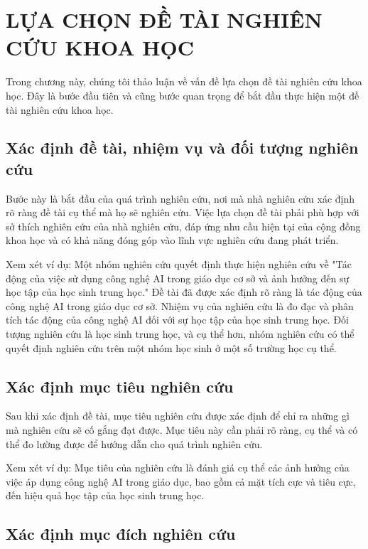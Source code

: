 \chapter{LỰA CHỌN ĐỀ TÀI NGHIÊN CỨU KHOA HỌC}

Trong chương này, chúng tôi thảo luận về vấn đề lựa chọn đề tài nghiên cứu khoa học. Đây là bước đầu tiên và cũng bước quan trọng để bắt đầu thực hiện một đề tài nghiên cứu khoa học.

\section{Xác định đề tài, nhiệm vụ và đối tượng nghiên cứu}

Bước này là bắt đầu của quá trình nghiên cứu, nơi mà nhà nghiên cứu xác định rõ ràng đề tài cụ thể mà họ sẽ nghiên cứu. Việc lựa chọn đề tài phải phù hợp với sở thích nghiên cứu của nhà nghiên cứu, đáp ứng nhu cầu hiện tại của cộng đồng khoa học và có khả năng đóng góp vào lĩnh vực nghiên cứu đang phát triển.

Xem xét ví dụ: Một nhóm nghiên cứu quyết định thực hiện nghiên cứu về "Tác động của việc sử dụng công nghệ AI trong giáo dục cơ sở và ảnh hưởng đến sự học tập của học sinh trung học." Đề tài đã được xác định rõ ràng là tác động của công nghệ AI trong giáo dục cơ sở. Nhiệm vụ của nghiên cứu là đo đạc và phân tích tác động của công nghệ AI đối với sự học tập của học sinh trung học. Đối tượng nghiên cứu là học sinh trung học, và cụ thể hơn, nhóm nghiên cứu có thể quyết định nghiên cứu trên một nhóm học sinh ở một số trường học cụ thể.

\section{Xác định mục tiêu nghiên cứu}

Sau khi xác định đề tài, mục tiêu nghiên cứu được xác định để chỉ ra những gì mà nghiên cứu sẽ cố gắng đạt được. Mục tiêu này cần phải rõ ràng, cụ thể và có thể đo lường được để hướng dẫn cho quá trình nghiên cứu.

Xem xét ví dụ: Mục tiêu của nghiên cứu là đánh giá cụ thể các ảnh hưởng của việc áp dụng công nghệ AI trong giáo dục, bao gồm cả mặt tích cực và tiêu cực, đến hiệu quả học tập của học sinh trung học. 

\section{Xác định mục đích nghiên cứu}

